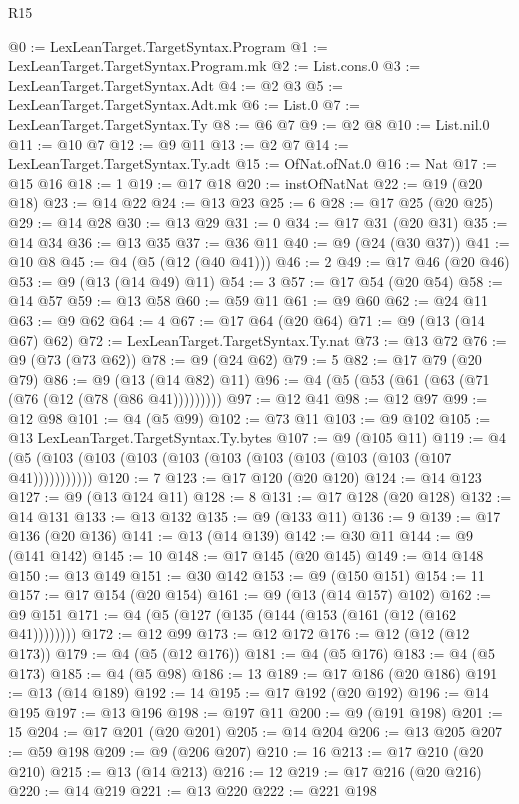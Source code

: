 \begin{lexlean}{R15}
\begin{coremodule}
@0 := LexLeanTarget.TargetSyntax.Program
@1 := LexLeanTarget.TargetSyntax.Program.mk
@2 := List.cons.{0}
@3 := LexLeanTarget.TargetSyntax.Adt
@4 := @2 @3
@5 := LexLeanTarget.TargetSyntax.Adt.mk
@6 := List.{0}
@7 := LexLeanTarget.TargetSyntax.Ty
@8 := @6 @7
@9 := @2 @8
@10 := List.nil.{0}
@11 := @10 @7
@12 := @9 @11
@13 := @2 @7
@14 := LexLeanTarget.TargetSyntax.Ty.adt
@15 := OfNat.ofNat.{0}
@16 := Nat
@17 := @15 @16
@18 := 1
@19 := @17 @18
@20 := instOfNatNat
@22 := @19 (@20 @18)
@23 := @14 @22
@24 := @13 @23
@25 := 6
@28 := @17 @25 (@20 @25)
@29 := @14 @28
@30 := @13 @29
@31 := 0
@34 := @17 @31 (@20 @31)
@35 := @14 @34
@36 := @13 @35
@37 := @36 @11
@40 := @9 (@24 (@30 @37))
@41 := @10 @8
@45 := @4 (@5 (@12 (@40 @41)))
@46 := 2
@49 := @17 @46 (@20 @46)
@53 := @9 (@13 (@14 @49) @11)
@54 := 3
@57 := @17 @54 (@20 @54)
@58 := @14 @57
@59 := @13 @58
@60 := @59 @11
@61 := @9 @60
@62 := @24 @11
@63 := @9 @62
@64 := 4
@67 := @17 @64 (@20 @64)
@71 := @9 (@13 (@14 @67) @62)
@72 := LexLeanTarget.TargetSyntax.Ty.nat
@73 := @13 @72
@76 := @9 (@73 (@73 @62))
@78 := @9 (@24 @62)
@79 := 5
@82 := @17 @79 (@20 @79)
@86 := @9 (@13 (@14 @82) @11)
@96 := @4 (@5 (@53 (@61 (@63 (@71 (@76 (@12 (@78 (@86 @41)))))))))
@97 := @12 @41
@98 := @12 @97
@99 := @12 @98
@101 := @4 (@5 @99)
@102 := @73 @11
@103 := @9 @102
@105 := @13 LexLeanTarget.TargetSyntax.Ty.bytes
@107 := @9 (@105 @11)
@119 := @4 (@5 (@103 (@103 (@103 (@103 (@103 (@103 (@103 (@103 (@103 (@107 @41)))))))))))
@120 := 7
@123 := @17 @120 (@20 @120)
@124 := @14 @123
@127 := @9 (@13 @124 @11)
@128 := 8
@131 := @17 @128 (@20 @128)
@132 := @14 @131
@133 := @13 @132
@135 := @9 (@133 @11)
@136 := 9
@139 := @17 @136 (@20 @136)
@141 := @13 (@14 @139)
@142 := @30 @11
@144 := @9 (@141 @142)
@145 := 10
@148 := @17 @145 (@20 @145)
@149 := @14 @148
@150 := @13 @149
@151 := @30 @142
@153 := @9 (@150 @151)
@154 := 11
@157 := @17 @154 (@20 @154)
@161 := @9 (@13 (@14 @157) @102)
@162 := @9 @151
@171 := @4 (@5 (@127 (@135 (@144 (@153 (@161 (@12 (@162 @41))))))))
@172 := @12 @99
@173 := @12 @172
@176 := @12 (@12 (@12 @173))
@179 := @4 (@5 (@12 @176))
@181 := @4 (@5 @176)
@183 := @4 (@5 @173)
@185 := @4 (@5 @98)
@186 := 13
@189 := @17 @186 (@20 @186)
@191 := @13 (@14 @189)
@192 := 14
@195 := @17 @192 (@20 @192)
@196 := @14 @195
@197 := @13 @196
@198 := @197 @11
@200 := @9 (@191 @198)
@201 := 15
@204 := @17 @201 (@20 @201)
@205 := @14 @204
@206 := @13 @205
@207 := @59 @198
@209 := @9 (@206 @207)
@210 := 16
@213 := @17 @210 (@20 @210)
@215 := @13 (@14 @213)
@216 := 12
@219 := @17 @216 (@20 @216)
@220 := @14 @219
@221 := @13 @220
@222 := @221 @198

\end{coremodule}
\end{lexlean}
